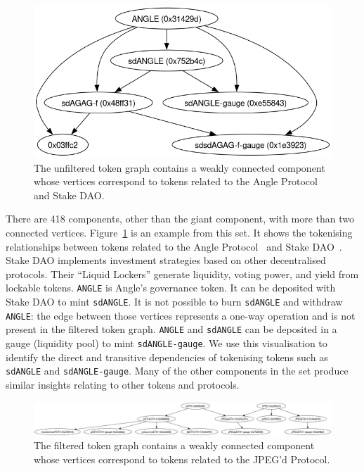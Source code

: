 \begin{figure}
  \centerline{\includegraphics[width=\columnwidth]{img/medium-components/angle-protocol.png}}
  \caption{The unfiltered token graph contains a weakly connected
    component whose vertices correspond to tokens related to the Angle
    Protocol and Stake DAO.}\label{fig:angle-protocol}
\end{figure}

There are \num{418} components, other than the giant component, with
more than two connected vertices.  Figure~\ref{fig:angle-protocol} is
an example from this set.  It shows the tokenising relationships
between tokens related to the Angle Protocol~\cite{angle-xx} and Stake
DAO~\cite{stake-dao-xx}.  Stake DAO implements investment strategies
based on other decentralised protocols.  Their ``Liquid Lockers''
generate liquidity, voting power, and yield from lockable tokens.
\texttt{ANGLE} is Angle's governance token.  It can be deposited with
Stake DAO to mint \texttt{sdANGLE}.  It is not possible to burn
\texttt{sdANGLE} and withdraw \texttt{ANGLE}: the edge between those
vertices represents a one-way operation and is not present in the
filtered token graph. \texttt{ANGLE} and \texttt{sdANGLE} can be
deposited in a gauge (liquidity pool) to mint \texttt{sdANGLE-gauge}.
We use this visualisation to identify the direct and transitive
dependencies of tokenising tokens such as \texttt{sdANGLE} and
\texttt{sdANGLE-gauge}.  Many of the other components in the set
produce similar insights relating to other tokens and protocols.

\begin{figure}
  \centerline{\includegraphics[width=\textwidth]{img/medium-components/jpegd-protocol.png}}
  \caption{The filtered token graph contains a weakly connected
    component whose vertices correspond to tokens related to the
    JPEG'd Protocol.}\label{fig:jpegd-protocol}
\end{figure}

